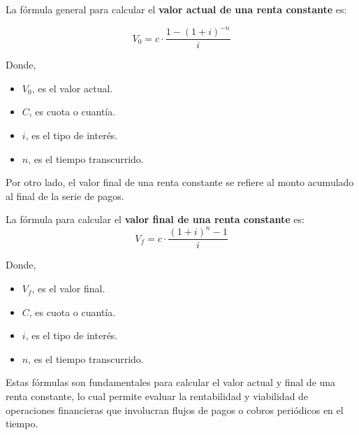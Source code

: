 \documentclass[
  letterpaper,
  DIV=11,
  numbers=noendperiod]{scrartcl}
\begin{document}
\begin{tcolorbox}[enhanced jigsaw, colframe=quarto-callout-note-color-frame, opacityback=0, colback=white, leftrule=.75mm, left=2mm, breakable, arc=.35mm, rightrule=.15mm, toprule=.15mm, bottomrule=.15mm]
\begin{minipage}[t]{5.5mm}
\textcolor{quarto-callout-note-color}{\faInfo}
\end{minipage}%
\begin{minipage}[t]{\textwidth - 5.5mm}

La fórmula general para calcular el \textbf{valor actual de una renta
constante} es:

\[V_0=c\cdot\frac{1-\left(1+i\right)^{-n}}{i}\]

Donde,

\begin{itemize}
\item
  \(V_0\), es el valor actual.
\item
  \(C\), es cuota o cuantía.
\item
  \(i\), es el tipo de interés.
\item
  \(n\), es el tiempo transcurrido.
\end{itemize}

\end{minipage}%
\end{tcolorbox}

Por otro lado, el valor final de una renta constante se refiere al monto
acumulado al final de la serie de pagos.

\begin{tcolorbox}[enhanced jigsaw, colframe=quarto-callout-note-color-frame, opacityback=0, colback=white, leftrule=.75mm, left=2mm, breakable, arc=.35mm, rightrule=.15mm, toprule=.15mm, bottomrule=.15mm]
\begin{minipage}[t]{5.5mm}
\textcolor{quarto-callout-note-color}{\faInfo}
\end{minipage}%
\begin{minipage}[t]{\textwidth - 5.5mm}

La fórmula para calcular el \textbf{valor final de una renta constante}
es: \[V_f=c\cdot\frac{\left(1+i\right)^{n}-1}{i}\]

Donde,

\begin{itemize}
\item
  \(V_f\), es el valor final.
\item
  \(C\), es cuota o cuantía.
\item
  \(i\), es el tipo de interés.
\item
  \(n\), es el tiempo transcurrido.
\end{itemize}

Estas fórmulas son fundamentales para calcular el valor actual y final
de una renta constante, lo cual permite evaluar la rentabilidad y
viabilidad de operaciones financieras que involucran flujos de pagos o
cobros periódicos en el tiempo.

\end{minipage}%
\end{tcolorbox}
\end{document}
